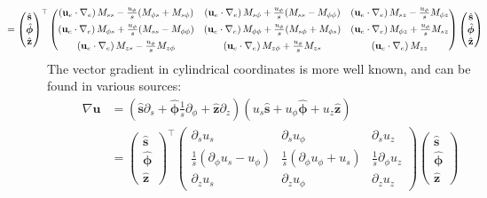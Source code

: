 \begin{equation}
\begin{aligned}
    &\mkern -80mu = \begin{pmatrix}\hat{\mathbf{s}} \\ \hat{\bm{\phi}} \\ \hat{\mathbf{z}}\end{pmatrix}^\top 
    \begin{pmatrix}
        \left(\mathbf{u}_e\cdot \nabla_e\right) M_{ss} - \frac{u_\phi}{s}(M_{\phi s} + M_{s\phi}) & \left(\mathbf{u}_e\cdot \nabla_e\right) M_{s\phi} + \frac{u_\phi}{s}(M_{ss} - M_{\phi\phi}) & \left(\mathbf{u}_e\cdot \nabla_e\right) M_{sz} - \frac{u_\phi}{s} M_{\phi z} \\[5pt] 
        \left(\mathbf{u}_e\cdot \nabla_e\right) M_{\phi s} + \frac{u_\phi}{s}(M_{ss} - M_{\phi\phi}) & \left(\mathbf{u}_e\cdot \nabla_e\right) M_{\phi\phi} + \frac{u_\phi}{s}(M_{s\phi} + M_{\phi s}) & \left(\mathbf{u}_e\cdot \nabla_e\right) M_{\phi z} + \frac{u_\phi}{s} M_{sz} \\[5pt] 
        \left(\mathbf{u}_e\cdot \nabla_e\right) M_{zs} - \frac{u_\phi}{s} M_{z\phi} & \left(\mathbf{u}_e\cdot \nabla_e\right) M_{z\phi} + \frac{u_\phi}{s} M_{zs} & \left(\mathbf{u}_e\cdot \nabla_e\right) M_{zz}
    \end{pmatrix}
    \begin{pmatrix}\hat{\mathbf{s}} \\ \hat{\bm{\phi}} \\ \hat{\mathbf{z}}\end{pmatrix}
\end{aligned}\end{equation}
%
The vector gradient in cylindrical coordinates is more well known, and can be found in various sources:
\begin{equation}\label{eqn:grad-u-cyl}
\begin{aligned}
    \nabla \mathbf{u} &= \left(\hat{\mathbf{s}}\partial_s + \hat{\bm{\phi}}\frac{1}{s}\partial_\phi + \hat{\mathbf{z}}\partial_z\right) (u_s \hat{\mathbf{s}} + u_\phi \hat{\bm{\phi}} + u_z \hat{\mathbf{z}}) \\
    &= \begin{pmatrix}\hat{\mathbf{s}} \\ \hat{\bm{\phi}} \\ \hat{\mathbf{z}}\end{pmatrix}^\top 
    \begin{pmatrix}
        \partial_s u_s & \partial_s u_\phi & \partial_s u_z \\ 
        \frac{1}{s}(\partial_\phi u_s - u_\phi) & \frac{1}{s}(\partial_\phi u_\phi + u_s) & \frac{1}{s} \partial_\phi u_z \\ 
        \partial_z u_s & \partial_z u_\phi & \partial_z u_z
    \end{pmatrix}
    \begin{pmatrix}\hat{\mathbf{s}} \\ \hat{\bm{\phi}} \\ \hat{\mathbf{z}}\end{pmatrix}
\end{aligned}\end{equation}

